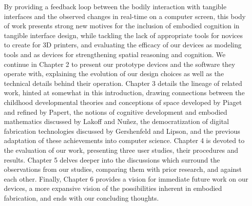 By providing a feedback loop between the bodily interaction with
tangible interfaces and the observed changes in real-time on a computer screen,
this body of work presents strong new motives for the inclusion of embodied
cognition in tangible interface design, while tackling the lack of appropriate
tools for novices to create for 3D printers, and evaluating the efficacy of our
devices as modeling tools and as devices for strengthening spatial reasoning and
cognition. We continue in Chapter 2 to present our prototype devices and the
software they operate with, explaining the evolution of our design choices as
well as the technical details behind their operation. Chapter 3 details the lineage
of related work, hinted at somewhat in this introduction, drawing connections
between the childhood developmental theories and conceptions of space developed
by Piaget and refined by Papert, the notions of cognitive development and
embodied mathematics discussed by Lakoff and Nu\~nez, the democratization of
digital fabrication technologies discussed by Gershenfeld and Lipson, and the
previous adaptation of these achievements into computer science. Chapter 4 is
devoted to the evaluation of our work, presenting three user studies, their
procedures and results. Chapter 5 delves deeper into the discussions which
surround the observations from our studies, comparing them with prior research,
and against each other. Finally, Chapter 6 provides a vision for immediate
future work on our devices, a more expansive vision of the possibilities
inherent in embodied fabrication, and ends with our concluding thoughts.



























